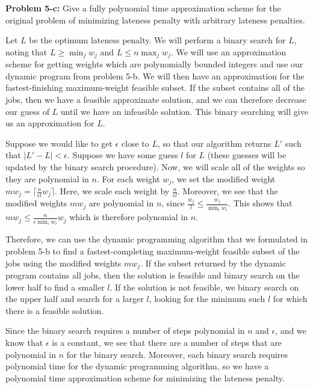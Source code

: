 \documentclass[psamsfonts]{amsart}
\newenvironment{sol}{\vspace{0.25cm}{\large \bfseries Solution:}}{\qedsymbol}
\newenvironment{prob}[1]{\begin{framed}{\large \bfseries Problem #1:}}{\end{framed}}
\begin{document}
\begin{prob}{5-c}
Give a fully polynomial time approximation scheme for the original problem of minimizing lateness penalty with arbitrary lateness penalties.
\end{prob}
\begin{sol}
Let $L$ be the optimum lateness penalty. We will perform a binary search for $L$, noting that $L \geq \min_j w_j$ and $L \leq n \max_j w_j$. We will use an approximation scheme for getting weights which are polynomially bounded integers and use our dynamic program from problem 5-b. We will then have an approximation for the fastest-finishing maximum-weight feasible subset. If the subset contains all of the jobs, then we have a feasible approximate solution, and we can therefore decrease our guess of $L$ until we have an infeasible solution. This binary searching will give us an approximation for $L$. 

Suppose we would like to get $\epsilon$ close to $L$, so that our algorithm returns $L'$ such that $|L' - L| < \epsilon$. Suppose we have some guess $l$ for $L$ (these guesses will be updated by the binary search procedure). Now, we will scale all of the weights so they are polynomial in $n$. For each weight $w_j$, we set the modified weight $mw_j = \lceil \frac{n}{\epsilon l} w_j \rceil$. Here, we scale each weight by $\frac{n}{\epsilon l}$. Moreover, we see that the modified weights $mw_j$ are polynomial in $n$, since $\frac{w_j}{l} \leq \frac{w_j}{\min_i w_i}$. This shows that $mw_j \leq \frac{n}{\epsilon \min_i w_i} w_j$ which is therefore polynomial in $n$. 

Therefore, we can use the dynamic programming algorithm that we formulated in problem 5-b to find a fastest-completing maximum-weight feasible subset of the jobs using the modified weights $mw_j$. If the subset returned by the dynamic program contains all jobs, then the solution is feasible and binary search on the lower half to find a smaller $l$. If the solution is not feasible, we binary search on the upper half and search for a larger $l$, looking for the minimum such $l$ for which there is a feasible solution.

Since the binary search requires a number of steps polynomial in $n$ and $\epsilon$, and we know that $\epsilon$ is a constant, we see that there are a number of steps that are polynomial in $n$ for the binary search. Moreover, each binary search requires polynomial time for the dynamic programming algorithm, so we have a polynomial time approximation scheme for minimizing the lateness penalty.  
\end{sol}
\end{document}
